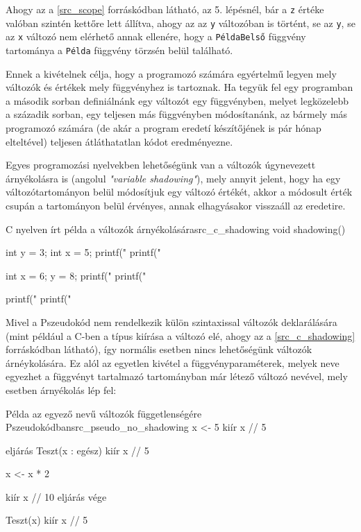 Ahogy az a \ref{src_scope} forráskódban látható, az 5. lépésnél, bár a \texttt{z} értéke valóban szintén kettőre lett állítva, ahogy az az \texttt{y} változóban is történt, se az \texttt{y}, se az \texttt{x} változó nem elérhető annak ellenére, hogy a \texttt{PéldaBelső} függvény tartománya a \texttt{Példa} függvény törzsén belül található.

Ennek a kivételnek célja, hogy a programozó számára egyértelmű legyen mely változók és értékek mely függvényhez is tartoznak. Ha tegyük fel egy programban a második sorban definiálnánk egy változót egy függvényben, melyet legközelebb a századik sorban, egy teljesen más függvényben módosítanánk, az bármely más programozó számára (de akár a program eredetí készítőjének is pár hónap elteltével) teljesen átláthatatlan kódot eredményezne.

Egyes programozási nyelvekben lehetőségünk van a változók úgynevezett árnyékolásra is (angolul \textit{"variable shadowing"}), mely annyit jelent, hogy ha egy változótartományon belül módosítjuk egy változó értékét, akkor a módosult érték csupán a tartományon belül érvényes, annak elhagyásakor visszaáll az eredetire.

\begin{code}{C nyelven írt példa a változók árnyékolására}{src_c_shadowing}
void shadowing() {
    int y = 3;
    int x = 5;
    printf("%
    printf("%

    {
        int x = 6;
        y = 8;
        printf("%
        printf("%
    }

    printf("%
    printf("%
}
\end{code}

Mivel a Pszeudokód nem rendelkezik külön szintaxissal változók deklarálására (mint például a C-ben a típus kiírása a változó elé, ahogy az a \ref{src_c_shadowing} forráskódban látható), így normális esetben nincs lehetőségünk változók árnéykolására. Ez alól az egyetlen kivétel a függvényparaméterek, melyek neve egyezhet a függvényt tartalmazó tartományban már létező változó nevével, mely esetben árnyékolás lép fel:

\begin{code}{Példa az egyező nevű változók függetlenségére Pszeudokódban}{src_pseudo_no_shadowing}
x <- 5
kiír x // 5

eljárás Teszt(x : egész)
    kiír x // 5

    x <- x * 2

    kiír x // 10
eljárás vége

Teszt(x)
kiír x // 5
\end{code}

